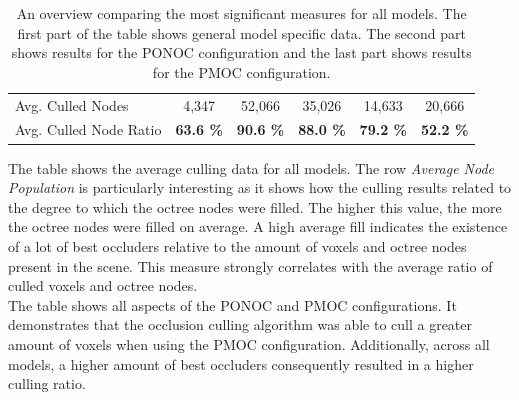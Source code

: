 \begin{table}[!htb]
\begin{tabular}{|lccccc|}
    \multicolumn{1}{|l|}{Avg. Culled Nodes}         & \multicolumn{1}{c|}{4,347}                    & \multicolumn{1}{c|}{52,066}                   & \multicolumn{1}{c|}{35,026}           & \multicolumn{1}{c|}{14,633}               & \multicolumn{1}{c|}{20,666}               \\
    \multicolumn{1}{|l|}{Avg. Culled Node Ratio}    & \multicolumn{1}{c|}{\textbf{63.6 \%}}         & \multicolumn{1}{c|}{\textbf{90.6 \%}}         & \multicolumn{1}{c|}{\textbf{88.0 \%}} & \multicolumn{1}{c|}{\textbf{79.2 \%}}     & \multicolumn{1}{c|}{\textbf{52.2 \%}}     \\ \hline
    
  \end{tabular}
  \caption{An overview comparing the most significant measures for all models. 
  The first part of the table shows general model specific data. The second part shows results for the 
  \ac{PONOC} configuration and the last part shows results for the \ac{PMOC} configuration.}
  \label{tbl:culling-result-overview}
\end{table}
  
\noindent
The table shows the average culling data for all models. The row \emph{Average Node Population} is 
particularly interesting as it shows how the culling results related to the degree to which the octree 
nodes were filled. The higher this value, the more the octree nodes were filled on average. A high 
average fill indicates the existence of a lot of best occluders relative to the amount of voxels and 
octree nodes present in the scene. This measure strongly correlates with the average ratio of culled 
voxels and octree nodes. \\

\noindent
The table shows all aspects of the \ac{PONOC} and \ac{PMOC} configurations. It demonstrates that the 
occlusion culling algorithm was able to cull a greater amount of voxels when using the \ac{PMOC} 
configuration. Additionally, across all models, a higher amount of best occluders consequently 
resulted in a higher culling ratio. \\

